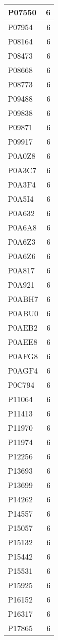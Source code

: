 \documentclass[
]{book}
\theoremstyle{definition}
\theoremstyle{definition}
\theoremstyle{definition}
\theoremstyle{definition}
\theoremstyle{remark}
\begin{document}
\begin{table}
\begin{tabular}{l|r}
\hline
P07550 & 6\\
\hline
P07954 & 6\\
\hline
P08164 & 6\\
\hline
P08473 & 6\\
\hline
P08668 & 6\\
\hline
P08773 & 6\\
\hline
P09488 & 6\\
\hline
P09838 & 6\\
\hline
P09871 & 6\\
\hline
P09917 & 6\\
\hline
P0A0Z8 & 6\\
\hline
P0A3C7 & 6\\
\hline
P0A3F4 & 6\\
\hline
P0A5I4 & 6\\
\hline
P0A632 & 6\\
\hline
P0A6A8 & 6\\
\hline
P0A6Z3 & 6\\
\hline
P0A6Z6 & 6\\
\hline
P0A817 & 6\\
\hline
P0A921 & 6\\
\hline
P0ABH7 & 6\\
\hline
P0ABU0 & 6\\
\hline
P0AEB2 & 6\\
\hline
P0AEE8 & 6\\
\hline
P0AFG8 & 6\\
\hline
P0AGF4 & 6\\
\hline
P0C794 & 6\\
\hline
P11064 & 6\\
\hline
P11413 & 6\\
\hline
P11970 & 6\\
\hline
P11974 & 6\\
\hline
P12256 & 6\\
\hline
P13693 & 6\\
\hline
P13699 & 6\\
\hline
P14262 & 6\\
\hline
P14557 & 6\\
\hline
P15057 & 6\\
\hline
P15132 & 6\\
\hline
P15442 & 6\\
\hline
P15531 & 6\\
\hline
P15925 & 6\\
\hline
P16152 & 6\\
\hline
P16317 & 6\\
\hline
P17865 & 6\\

\end{tabular}
\end{table}
\end{document}
